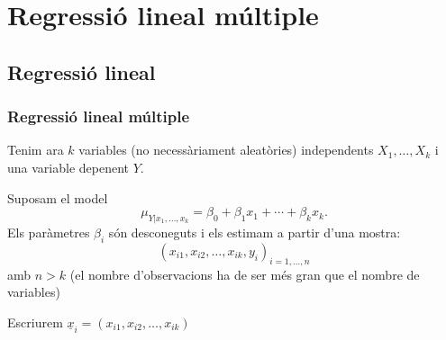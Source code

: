 \documentclass[12pt,t]{beamer}
\theoremstyle{plain}
\theoremstyle{definition}
\begin{document}
%
%
%
%
%
%
%
%
%


\section{Regressió lineal múltiple}
\subsection{Regressió lineal}

\begin{frame}
\frametitle{Regressió lineal múltiple}

Tenim ara $k$ variables (no necessàriament aleatòries) independents $X_1,\ldots, X_k$ i una
variable depenent $Y$.
\medskip

Suposam el model
$$
\mu_{Y|x_1,\ldots,x_k}= \beta_0+\beta_1 x_1+\cdots+\beta_k x_k.
$$
Els paràmetres $\beta_i$ són desconeguts i els estimam  a partir d'una mostra:
$$
(x_{i1},x_{i2},\ldots,x_{ik},y_i)_{i=1,\ldots,n}
$$
amb $n>k$ (el nombre d'observacions ha de ser més gran que el nombre de variables)
\medskip

Escriurem $\underline{x}_i=(x_{i1},x_{i2},\ldots,x_{ik})$
\end{frame}
\end{document}
